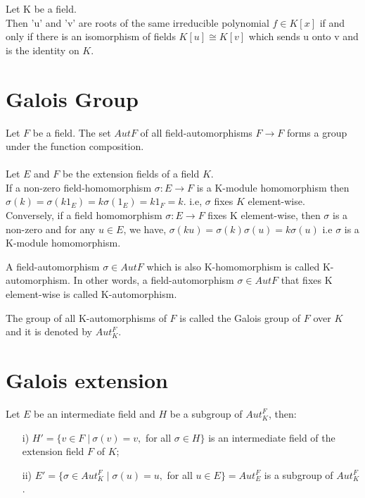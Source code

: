\begin{theorem}
 Let K be a field.\\
 Then 'u' and 'v' are  roots of the same irreducible polynomial \(f \in K[x]\) if and only if there is an isomorphism of fields \(K[u] \cong K[v]\) which sends u onto v and is the identity on \(K\).
\end{theorem}

\section{Galois Group}
Let \(F\) be a field. The set \(AutF\) of all field-automorphisms \(F \rightarrow F \) forms a group under the function composition.\\ \\
Let \(E\) and \(F\) be the extension fields of a field \(K\).\\
If a non-zero field-homomorphism \(\sigma : E \rightarrow F\) is a K-module homomorphism then\\
\(\sigma(k)=\sigma(k1_E)=k\sigma(1_E)=k1_F=k\).\hspace{7mm}
i.e, \(\sigma\) fixes \(K\) element-wise.\\
Conversely, if a field homomorphism \(\sigma : E \rightarrow F\) fixes K element-wise, then \(\sigma\) is a non-zero and for any \(u \in E\), we have, \(\sigma(ku)=\sigma(k)\sigma(u)=k\sigma(u)\)
i.e \(\sigma\) is a K-module homomorphism.\\
\begin{definition}
  A field-automorphism \(\sigma \in Aut F\) which is also K-homomorphism is called K-automorphism. In other words, a field-automorphism \(\sigma \in Aut F\) that fixes K element-wise is called K-automorphism.
\end{definition}

\begin{definition}
  The group of all K-automorphisms of \(F\) is called the Galois group of \(F\) over \(K\) and it is denoted by \(Aut_K^F\).
\end{definition}

\section{Galois extension}
Let \(E\) be an intermediate field and \(H\) be a subgroup of \(Aut_K^F\), then:
\begin{enumerate}
\item[i)] \(H' = \{v \in F \; | \: \sigma(v)=v,\) for all \(\sigma \in H \}\) is an intermediate field of the extension field \(F\) of \(K\);
\item[ii)] \(E' = \{\sigma \in Aut_K^F \; | \; \sigma(u)=u,\) for all \(u \in E\}=Aut_E^F\) is a subgroup of \(Aut_K^F\).
\end{enumerate}

